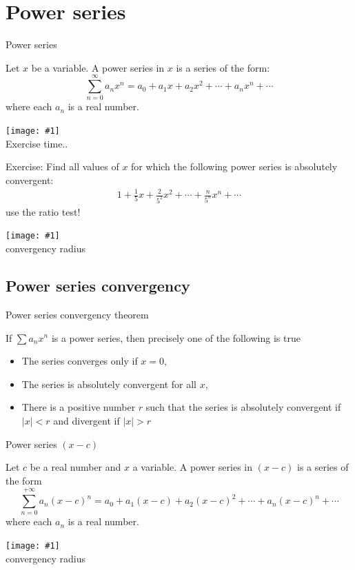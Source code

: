 \documentclass[newPxFont]{beamer}
\newcommand \imageFrame[2]{
\begingroup
\begin{frame}
  \begin{center}
\texttt{[image: \#1]}\\
\Large #2
    \end{center}
\end{frame}
\endgroup
}
\begin{document}
\section{Power series}
\begin{frame}{Power series}
\begin{theorem}
  Let $x$ be a variable. \alert{A power series in $x$} is a series of the form:
  \begin{equation}
    \sum_{n=0}^{\infty} a_n x^n=a_0+a_1 x+a_2 x^2+\cdots+a_n x^n+\cdots
  \end{equation}
  where each $a_n$ is a real number\cite{Swokowski1983}.
\end{theorem}
\end{frame}
\imageFrame{exercise}{Exercise time..}
\begin{frame}{Exercise:}
  Find all values of $x$ for which the following power series is absolutely convergent:
  \begin{eqnarray}
    1+\frac{1}{5}x+\frac{2}{5^2}x^2+\cdots+\frac{n}{5^n}x^n+\cdots
  \end{eqnarray}
  \alert{use the ratio test!}
\end{frame}
\imageFrame{geometryc}{convergency radius}
\subsection{Power series convergency}
\begin{frame}{Power series convergency theorem}
\begin{theorem}
  If $\sum a_n x^n$ is a power series, then precisely one of the following is true
  \begin{itemize}
    \item The series converges only if $x=0$,
    \item The series is absolutely convergent for all $x$,
    \item There is a positive number $r$ such that the series is absolutely convergent if $|x|<r$ and divergent if $|x|>r$
  \end{itemize}
\end{theorem}
\end{frame}
\begin{frame}{Power series $(x-c)$}
\begin{theorem}
  Let $c$ be a real number and $x$ a variable. \alert{A power series in} $(x-c)$ is a series of the form
  \begin{equation}
    \sum_{n=0}^{+\infty}a_n (x-c)^n=a_0+a_1(x-c)+a_2(x-c)^2+\cdots+a_n(x-c)^n+\cdots
  \end{equation}
  where each $a_n$ is a real number.
\end{theorem}
\end{frame}
\imageFrame{geometryc2}{convergency radius}
\end{document}
